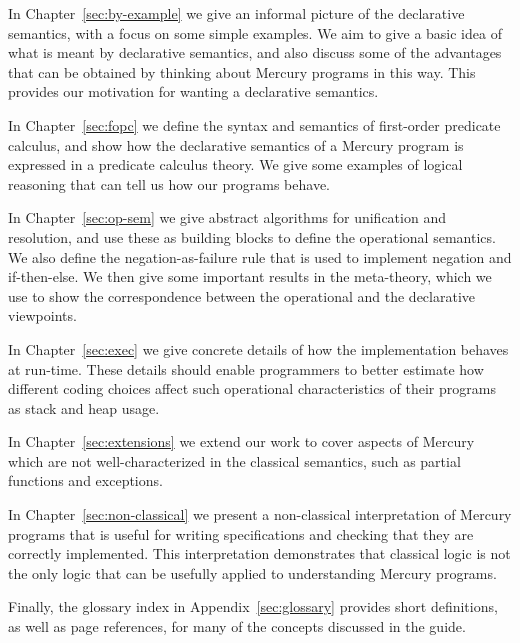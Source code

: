 In Chapter~\ref{sec:by-example} we give
an informal picture of the declarative semantics,
with a focus on some simple examples.
We aim to give a basic idea of
what is meant by declarative semantics,
and also discuss some of the advantages that can be obtained
by thinking about Mercury programs in this way.
This provides our motivation for
wanting a declarative semantics.

In Chapter~\ref{sec:fopc} we define
the syntax and semantics of first-order predicate calculus,
and show how the declarative semantics of a Mercury program
is expressed in a predicate calculus theory.
We give some examples of logical reasoning
that can tell us how our programs behave.

In Chapter~\ref{sec:op-sem}
we give abstract algorithms for unification and resolution,
and use these as building blocks to define the operational semantics.
We also define the negation-as-failure rule
that is used to implement negation and if-then-else.
We then give some important results in the meta-theory,
which we use to show the correspondence between
the operational and the declarative viewpoints.

In Chapter~\ref{sec:exec}
we give concrete details of how the implementation
behaves at run-time.
These details should enable programmers to better estimate
how different coding choices affect
such operational characteristics of their programs
as stack and heap usage.

In Chapter~\ref{sec:extensions} we extend our work to cover aspects of Mercury
which are not well-characterized in the classical semantics,
such as partial functions and exceptions.

In Chapter~\ref{sec:non-classical} we present
a non-classical interpretation of Mercury programs
that is useful for writing specifications
and checking that they are correctly implemented.
This interpretation demonstrates that
classical logic is not the only logic
that can be usefully applied to understanding Mercury programs.

Finally,
the glossary index in Appendix~\ref{sec:glossary}
provides short definitions,
as well as page references,
for many of the concepts discussed in the guide.
